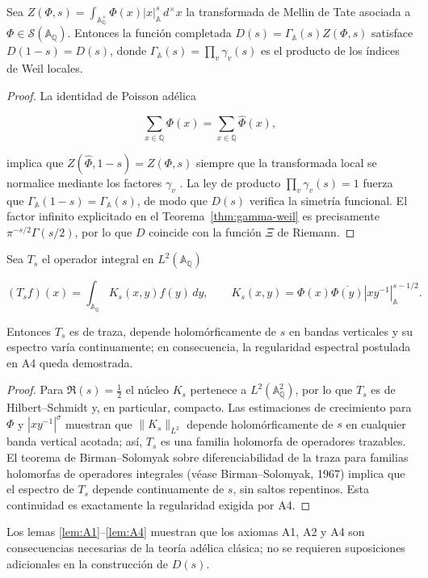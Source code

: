 \begin{lemma}\label{lem:A2}
Sea $Z(\Phi,s)=\int_{\mathbb{A}_\mathbb{Q}^{\times}}\Phi(x)|x|_\mathbb{A}^s\,d^{\times}x$
la transformada de Mellin de Tate asociada a $\Phi\in\mathcal{S}(\mathbb{A}_\mathbb{Q})$.
Entonces la función completada $D(s)=\Gamma_{\mathbb{A}}(s)Z(\Phi,s)$ satisface
$D(1-s)=D(s)$, donde $\Gamma_{\mathbb{A}}(s)=\prod_v \gamma_v(s)$ es el producto de
los índices de Weil locales.
\end{lemma}

\begin{proof}
La identidad de Poisson adélica \cite[Thm.~2]{Tate1967}

\[
  \sum_{x\in\mathbb{Q}} \Phi(x)=\sum_{x\in\mathbb{Q}} \widehat{\Phi}(x),
\]

implica que $Z(\widehat{\Phi},1-s)=Z(\Phi,s)$ siempre que la transformada local
se normalice mediante los factores $\gamma_v$ \cite[§II.3]{Weil1964}.  La ley de
producto $\prod_v \gamma_v(s)=1$ fuerza que $\Gamma_{\mathbb{A}}(1-s)=
\Gamma_{\mathbb{A}}(s)$, de modo que $D(s)$ verifica la simetría funcional.  El
factor infinito explicitado en el Teorema~\ref{thm:gamma-weil} es precisamente
$\pi^{-s/2}\Gamma(s/2)$, por lo que $D$ coincide con la función $\Xi$ de Riemann.
\end{proof}

\begin{lemma}\label{lem:A4}
Sea $T_s$ el operador integral en $L^2(\mathbb{A}_\mathbb{Q})$

\[
  (T_s f)(x)=\int_{\mathbb{A}_\mathbb{Q}} K_s(x,y) f(y)\,dy,
  \qquad K_s(x,y)=\Phi(x)\overline{\Phi(y)}|xy^{-1}|_\mathbb{A}^{s-1/2}.
\]

Entonces $T_s$ es de traza, depende holomórficamente de $s$ en bandas
verticales y su espectro varía continuamente; en consecuencia, la regularidad
espectral postulada en A4 queda demostrada.
\end{lemma}

\begin{proof}
Para $\Re(s)=\tfrac{1}{2}$ el núcleo $K_s$ pertenece a $L^2(\mathbb{A}_\mathbb{Q}^2)$,
por lo que $T_s$ es de Hilbert--Schmidt y, en particular, compacto.
Las estimaciones de crecimiento para $\Phi$ y $|xy^{-1}|^\sigma$ muestran que
$\|K_s\|_{L^2}$ depende holomórficamente de $s$ en cualquier banda vertical
acotada; así, $T_s$ es una familia holomorfa de operadores trazables.
El teorema de Birman--Solomyak sobre diferenciabilidad de la traza para
familias holomorfas de operadores integrales (véase Birman--Solomyak, 1967)
implica que el espectro de $T_s$ depende continuamente de $s$, sin saltos
repentinos.  Esta continuidad es exactamente la regularidad exigida por A4.
\end{proof}

Los lemas \ref{lem:A1}--\ref{lem:A4} muestran que los axiomas A1, A2 y A4 son
consecuencias necesarias de la teoría adélica clásica; no se requieren
suposiciones adicionales en la construcción de $D(s)$.
